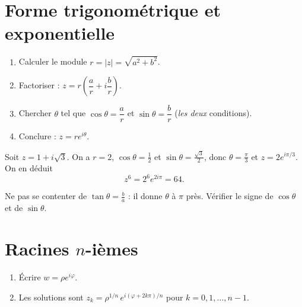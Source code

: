 
\section{Forme trigonométrique et exponentielle}

\begin{methode}[Mettre $z=a+ib$ sous forme exponentielle]
\begin{enumerate}[label=\textbf{Étape \arabic*.}]
  \item Calculer le module $r=|z|=\sqrt{a^2+b^2}$.
  \item Factoriser : $z=r\left(\dfrac ar+i\dfrac br\right)$.
  \item Chercher $\theta$ tel que $\cos\theta=\dfrac ar$ et $\sin\theta=\dfrac br$ (\emph{les deux} conditions).
  \item Conclure : $z=re^{i\theta}$.
\end{enumerate}
\end{methode}

\begin{exemple}
Soit $z=1+i\sqrt3$. On a $r=2$, $\cos\theta=\frac12$ et $\sin\theta=\frac{\sqrt3}2$, donc $\theta=\frac\pi3$ et $z=2e^{i\pi/3}$. On en déduit
\[
  z^6=2^6e^{2i\pi}=64 .
\]
\end{exemple}

\begin{attention}
Ne pas se contenter de $\tan\theta=\frac ba$ : il donne $\theta$ à $\pi$ près. Vérifier le signe de $\cos\theta$ et de $\sin\theta$.
\end{attention}

\section{Racines $n$-ièmes}

\begin{methode}[Résoudre $z^n=w$]
\begin{enumerate}[label=\textbf{Étape \arabic*.}]
  \item Écrire $w=\rho e^{i\varphi}$.
  \item Les solutions sont $z_k=\rho^{1/n}\,e^{i(\varphi+2k\pi)/n}$ pour $k=0,1,\dots,n-1$.
\end{enumerate}
\end{methode}

